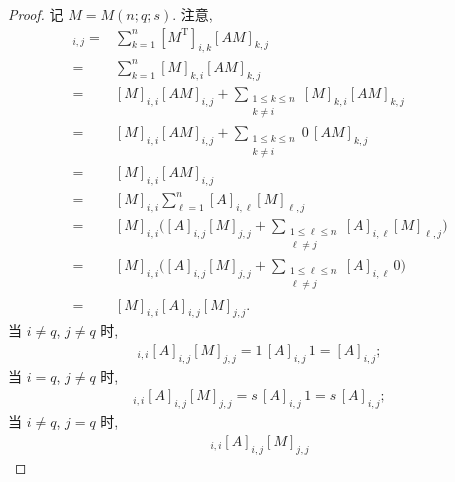 \documentclass[../libro.tex]{subfiles}
\begin{document}
\begin{proof}
    记 \(M = M(n; q; s)\).
    注意,
    \begin{align*}
        [M^{\mathrm{T}} A M]_{i,j}
        = {} &
        \sum_{k = 1}^{n} {
            [M^{\mathrm{T}}]_{i,k} [A M]_{k,j}
        }
        \\
        = {} &
        \sum_{k = 1}^{n} {
            [M]_{k,i} [A M]_{k,j}
        }
        \\
        = {} &
        [M]_{i,i} [A M]_{i,j}
        +
        \sum_{\substack{1 \leq k \leq n \\ k \neq i}}
        {
            [M]_{k,i} [A M]_{k,j}
        }
        \\
        = {} &
        [M]_{i,i} [A M]_{i,j}
        +
        \sum_{\substack{1 \leq k \leq n \\ k \neq i}}
        {
            0\, [A M]_{k,j}
        }
        \\
        = {} &
        [M]_{i,i}
        [A M]_{i,j}
        \\
        = {} &
        [M]_{i,i}
        \sum_{\ell = 1}^{n}
        {[A]_{i,\ell} [M]_{\ell,j}}
        \\
        = {} &
        [M]_{i,i}
        \Bigg(
            [A]_{i,j} [M]_{j,j}
            +
            \sum_{\substack{1 \leq \ell \leq n \\ \ell \neq j}}
            {[A]_{i,\ell} [M]_{\ell,j}}
        \Bigg)
        \\
        = {} &
        [M]_{i,i}
        \Bigg(
            [A]_{i,j} [M]_{j,j}
            +
            \sum_{\substack{1 \leq \ell \leq n \\ \ell \neq j}}
            {[A]_{i,\ell} \, 0}
        \Bigg)
        \\
        = {} &
        [M]_{i,i}
        [A]_{i,j}
        [M]_{j,j}.
    \end{align*}
    当 \(i \neq q\), \(j \neq q\) 时,
    \begin{align*}
        [M]_{i,i}
        [A]_{i,j}
        [M]_{j,j}
        = 1\, [A]_{i,j}\, 1
        = [A]_{i,j};
    \end{align*}
    当 \(i = q\), \(j \neq q\) 时,
    \begin{align*}
        [M]_{i,i}
        [A]_{i,j}
        [M]_{j,j}
        = s\, [A]_{i,j}\, 1
        = s\, [A]_{i,j};
    \end{align*}
    当 \(i \neq q\), \(j = q\) 时,
    \begin{align*}
        [M]_{i,i}
        [A]_{i,j}
        [M]_{j,j}

\end{align*}
\end{proof}
\end{document}
